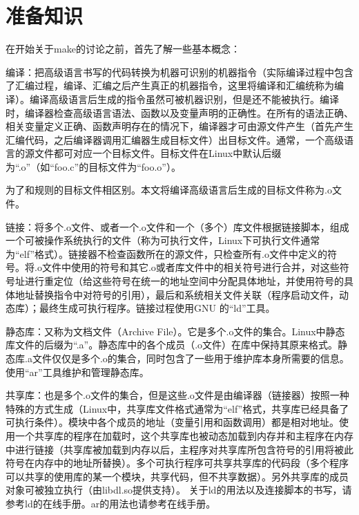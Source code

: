 \section{准备知识}
在开始关于make的讨论之前，首先了解一些基本概念：

编译：把高级语言书写的代码转换为机器可识别的机器指令（实际编译过程中包含了汇编过程，编译、汇编之后产生真正的机器指令，这里将编译和汇编统称为编译）。编译高级语言后生成的指令虽然可被机器识别，但是还不能被执行。编译时，编译器检查高级语言语法、函数以及变量声明的正确性。在所有的语法正确、相关变量定义正确、函数声明存在的情况下，编译器才可由源文件产生（首先产生汇编代码，之后编译器调用汇编器生成目标文件）出目标文件。通常，一个高级语言的源文件都可对应一个目标文件。目标文件在Linux中默认后缀为“.o”（如“foo.c”的目标文件为“foo.o”）。

为了和规则的目标文件相区别。本文将编译高级语言后生成的目标文件称为.o文件。
 
链接：将多个.o文件、或者一个.o文件和一个（多个）库文件根据链接脚本，组成一个可被操作系统执行的文件（称为可执行文件，Linux下可执行文件通常为“elf”格式）。链接器不检查函数所在的源文件，只检查所有.o文件中定义的符号。将.o文件中使用的符号和其它.o或者库文件中的相关符号进行合并，对这些符号址进行重定位（给这些符号在统一的地址空间中分配具体地址，并使用符号的具体地址替换指令中对符号的引用），最后和系统相关文件关联（程序启动文件，动态库）；最终生成可执行程序。链接过程使用GNU 的“ld”工具。
 
静态库：又称为文档文件（Archive File）。它是多个.o文件的集合。Linux中静态库文件的后缀为“.a”。静态库中的各个成员（.o文件）在库中保持其原来格式。静态库.a文件仅仅是多个.o的集合，同时包含了一些用于维护库本身所需要的信息。使用“ar”工具维护和管理静态库。 
 
共享库：也是多个.o文件的集合，但是这些.o文件是由编译器（链接器）按照一种特殊的方式生成（Linux中，共享库文件格式通常为“elf”格式，共享库已经具备了可执行条件）。模块中各个成员的地址（变量引用和函数调用）都是相对地址。使用一个共享库的程序在加载时，这个共享库也被动态加载到内存并和主程序在内存中进行链接（共享库被加载到内存以后，主程序对共享库所包含符号的引用将被此符号在内存中的地址所替换）。多个可执行程序可共享共享库的代码段（多个程序可以共享的使用库的某一个模块，共享代码，但不共享数据）。另外共享库的成员对象可被独立执行（由libdl.so提供支持）。
关于ld的用法以及连接脚本的书写，请参考ld的在线手册。ar的用法也请参考在线手册。
